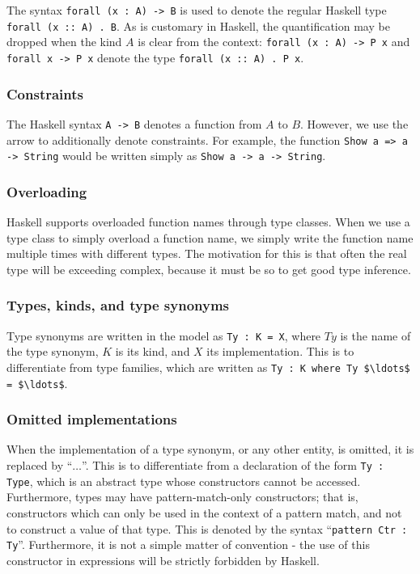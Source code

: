\documentclass[12pt, svgnames]{article}
\let\Oldsubsubsection\subsubsection
\renewcommand{\subsubsection}{\FloatBarrier\Oldsubsubsection}
\begin{document}
The syntax \lstinline!forall (x : A) -> B! is used to denote the regular
Haskell type \texttt{forall (x :: A) . B}. As is customary in Haskell, the quantification
may be dropped when the kind $A$ is clear from the context: \lstinline!forall (x : A) -> P x! and
\lstinline!forall x -> P x! denote the type \texttt{forall (x :: A) . P x}.

\subsubsection*{Constraints}
The Haskell syntax \texttt{A -> B} denotes a function from $A$ to $B$. However,
we use the arrow to additionally denote constraints. For example, the function
\texttt{Show a => a -> String} would be written simply as \lstinline!Show a -> a -> String!.

\subsubsection*{Overloading}
Haskell supports overloaded function names through type classes. When we use a type 
class to simply overload a function name, we simply write the function name
multiple times with different types. The motivation for this is that often the 
real type will be exceeding complex, because it must be so to get good type inference. 

\subsubsection*{Types, kinds, and type synonyms}
Type synonyms are written in the model as \lstinline!Ty : K = X!, where $Ty$ is the name
of the type synonym, $K$ is its kind, and $X$ its implementation. This is to differentiate
from type families, which are written as \lstinline!Ty : K where Ty $\ldots$ = $\ldots$!. 

\subsubsection*{Omitted implementations}
When the implementation of a type synonym, or any other entity, is omitted, it
is replaced by ``$\ldots$''. This is to differentiate from a declaration of the form
\lstinline!Ty : Type!, which is an abstract type whose constructors cannot be
accessed. Furthermore, types may have pattern-match-only constructors; that is,
constructors which can only be used in the context of a pattern match, and not
to construct a value of that type. This is denoted by the syntax
``\lstinline!pattern Ctr : Ty!''. Furthermore, it is not a simple matter of
convention - the use of this constructor in expressions will be strictly
forbidden by Haskell.
\end{document}
